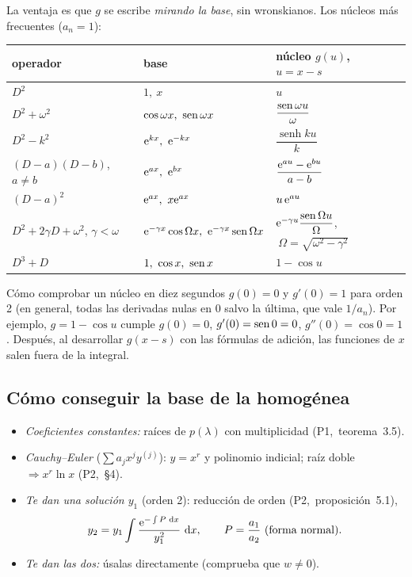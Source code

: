 \documentclass[11pt,twoside]{article}
\newcommand\pI[1]{(P1,~#1)}
\newcommand\pII[1]{(P2,~#1)}
\providecommand\senh{\operatorname{senh}}
\begin{document}
La ventaja es que $g$ se escribe \emph{mirando la base}, sin wronskianos. Los núcleos más frecuentes ($a_n=1$):

\begin{center}
\renewcommand\arraystretch{1.4}
\small
\begin{tabular}{@{}l l l@{}}
\toprule
\textcolor{acc}{operador} & \textcolor{acc}{base} & \textcolor{acc}{núcleo $g(u)$, $u=x-s$}\\
\midrule
$D^2$ & $1,\ x$ & $u$\\
$D^2+\omega^2$ & $\cos\omega x,\ \sen\omega x$ & $\dfrac{\operatorname{sen}\omega u}{\omega}$\\
$D^2-k^2$ & $\e^{kx},\ \e^{-kx}$ & $\dfrac{\senh ku}{k}$\\
$(D-a)(D-b)$, $a\neq b$ & $\e^{ax},\ \e^{bx}$ & $\dfrac{\mathrm{e}^{au}-\mathrm{e}^{bu}}{a-b}$\\
$(D-a)^2$ & $\e^{ax},\ x\e^{ax}$ & $u\,\mathrm{e}^{au}$\\
$D^2+2\gamma D+\omega^2$, $\gamma<\omega$ & $\mathrm{e}^{-\gamma x}\cos\Omega x,\ \mathrm{e}^{-\gamma x}\operatorname{sen}\Omega x$ & $\mathrm{e}^{-\gamma u}\dfrac{\operatorname{sen}\Omega u}{\Omega}$, $\ \Omega=\sqrt{\omega^2-\gamma^2}$\\
$D^3+D$ & $1,\ \cos x,\ \sen x$ & $1-\cos u$\\
\bottomrule
\end{tabular}
\end{center}

\begin{consejo}{Cómo comprobar un núcleo en diez segundos}
$g(0)=0$ y $g'(0)=1$ para orden 2 (en general, todas las derivadas nulas en $0$ salvo la última, que vale $1/a_n$). Por
ejemplo, $g=1-\cos u$ cumple $g(0)=0$, $g'(0)=\operatorname{sen}0=0$, $g''(0)=\cos0=1$. Después, al desarrollar $g(x-s)$ con las
fórmulas de adición, las funciones de $x$ salen fuera de la integral.
\end{consejo}

\subsection{Cómo conseguir la base de la homogénea}\label{sec:base}

\begin{itemize}
\item \emph{Coeficientes constantes:} raíces de $p(\lambda)$ con multiplicidad \pI{teorema~3.5}.
\item \emph{Cauchy--Euler} ($\sum a_jx^jy^{(j)}$): $y=x^r$ y polinomio indicial; raíz doble $\Rightarrow x^r\ln x$ \pII{§4}.
\item \emph{Te dan una solución $y_1$} (orden 2): reducción de orden \pII{proposición~5.1},
\begin{equation}\label{eq:reduccion}
y_2=y_1\int\frac{\mathrm{e}^{-\int P\,\mathop{}\!\mathrm{d} x}}{y_1^2}\,\mathop{}\!\mathrm{d} x,\qquad P=\frac{a_1}{a_2}\ \text{(forma normal)}.
\end{equation}
\item \emph{Te dan las dos:} úsalas directamente (comprueba que $w\neq0$).
\end{itemize}
\end{document}

